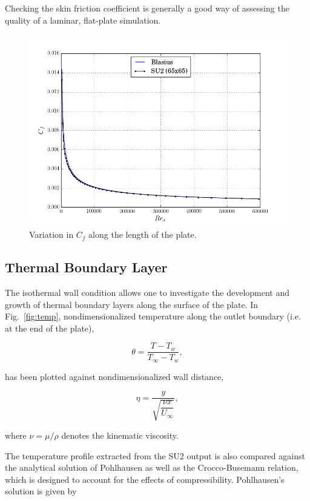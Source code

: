 \documentclass[12pt,letterpaper]{article}
\begin{document}
Checking the skin friction coefficient is generally a good way of assessing the quality of a laminar, flat-plate simulation.

\begin{figure}[h] 
\centering
\includegraphics[width=\linewidth]{cf_350.png}
\caption{Variation in $C_f$ along the length of the plate.}
\label{fig:cf}
\end{figure}

\subsection*{Thermal Boundary Layer}
The isothermal wall condition allows one to investigate the development and growth of thermal boundary layers along the surface of the plate. In Fig.~\ref{fig:temp}, nondimensionalized temperature along the outlet boundary (i.e. at the end of the plate), 

\begin{equation*}
\theta = \dfrac{T-T_w}{T_\infty-T_w},
\end{equation*}

has been plotted against nondimensionalized wall distance,

\begin{equation*}
\eta = \dfrac{y}{\sqrt{\dfrac{\nu x}{U_\infty}}},
\end{equation*}

where $\nu = \mu/\rho$ denotes the kinematic viscosity.

The temperature profile extracted from the SU2 output is also compared against the analytical solution of Pohlhausen as well as the Crocco-Busemann relation, which is designed to account for the effects of compressibility. Pohlhausen's solution is given by
\end{document}
